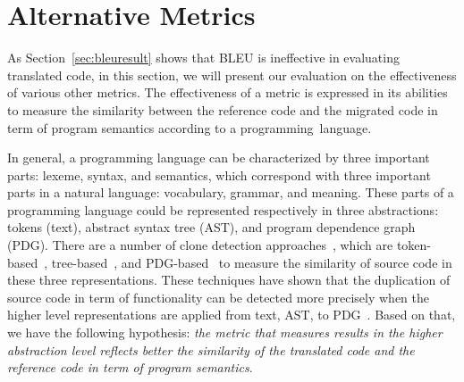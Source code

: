 \section{Alternative Metrics}
\label{sec:alternatives}
%

As Section~\ref{sec:bleuresult} shows that BLEU is ineffective in
evaluating translated code, in this section, we will present our
evaluation on the effectiveness of various other metrics. The
effectiveness of a metric is expressed in its abilities to measure the
similarity between the reference code and the migrated code in term of
program semantics according to a programming~language.


In general, a programming language can be characterized by three
important parts: lexeme, syntax, and semantics, which correspond
with three important parts in a natural language: vocabulary, grammar,
and meaning.
These parts of a programming language could be represented respectively in three 
abstractions: tokens (text), abstract syntax tree (AST), and program 
dependence graph (PDG).
%
There are a number of clone detection approaches~\cite{clone-tse07},
which are token-based~\cite{ccfinder},
tree-based~\cite{baxter98,deckard}, and PDG-based~\cite{deckard2} to
measure the similarity of source code in these three representations.
These techniques have shown that the duplication of source code in
term of functionality can be detected more precisely when the higher
level representations are applied from text, AST, to
PDG~\cite{clone-tse07,deckard2}.
Based on that, we have the following hypothesis: \textit{the metric
  that measures results in the higher abstraction level reflects
  better the similarity of the translated code and the reference code
  in term of program semantics}.

